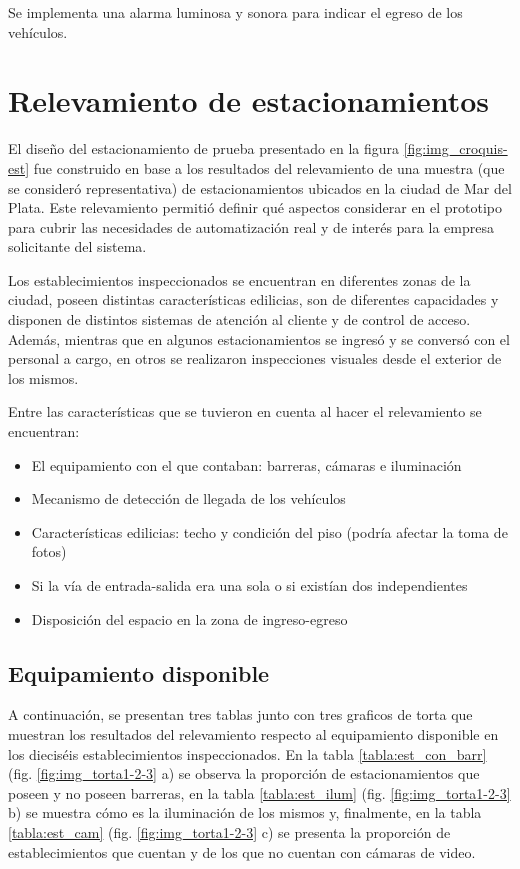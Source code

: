 Se implementa una alarma luminosa y sonora para indicar el egreso de los vehículos.


\section{Relevamiento de estacionamientos}

El diseño del estacionamiento de prueba presentado en la figura \ref{fig:img_croquis-est} fue construido en base a los resultados del relevamiento de una muestra (que se consideró representativa) de estacionamientos ubicados en la ciudad de Mar del Plata. Este relevamiento permitió definir qué aspectos considerar en el prototipo para cubrir las necesidades de automatización real y de interés para la empresa solicitante del sistema.

Los establecimientos inspeccionados se encuentran en diferentes zonas de la ciudad, poseen distintas características edilicias, son de diferentes capacidades y disponen de distintos sistemas de atención al cliente y de control de acceso. Además, mientras que en algunos estacionamientos se ingresó y se conversó con el personal a cargo, en otros se realizaron inspecciones visuales desde el exterior de los mismos. 

Entre las características que se tuvieron en cuenta al hacer el relevamiento se encuentran:
\begin{itemize}
	\item El equipamiento con el que contaban: barreras, cámaras e iluminación
	\item Mecanismo de detección de llegada de los vehículos
	\item Características edilicias: techo y condición del piso (podría afectar la toma de fotos)
	\item Si la vía de entrada-salida era una sola o si existían dos independientes
	\item Disposición del espacio en la zona de ingreso-egreso
\end{itemize}

\subsection{Equipamiento disponible}
A continuación, se presentan tres tablas junto con tres graficos de torta que muestran los resultados del relevamiento respecto al equipamiento disponible en los dieciséis establecimientos inspeccionados. En la tabla \ref{tabla:est_con_barr} (fig. \ref{fig:img_torta1-2-3} a) se observa la proporción de estacionamientos que poseen y no poseen barreras, en la tabla \ref{tabla:est_ilum} (fig. \ref{fig:img_torta1-2-3} b) se muestra cómo es la iluminación de los mismos y, finalmente, en la tabla \ref{tabla:est_cam} (fig. \ref{fig:img_torta1-2-3} c) se presenta la proporción de establecimientos que cuentan y de los que no cuentan con cámaras de video.

